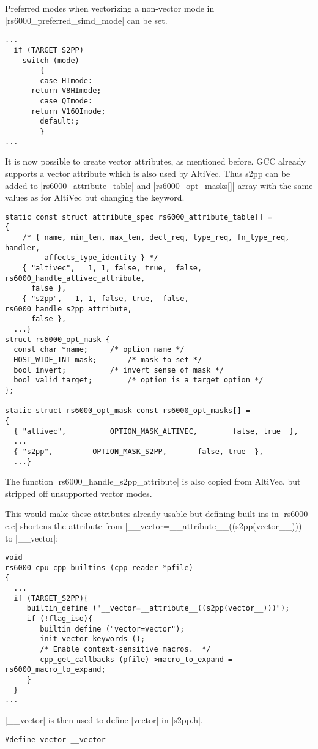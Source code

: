 Preferred modes when vectorizing a non-vector mode in |rs6000_preferred_simd_mode| can be set.
\begin{lstlisting}
...
  if (TARGET_S2PP)
    switch (mode)
        {
        case HImode:
      return V8HImode;
        case QImode:
      return V16QImode;
        default:;
        }
... 
\end{lstlisting}

It is now possible to create vector attributes, as mentioned before.
\ac{GCC} already supports a vector attribute which is also used by AltiVec.
Thus \ac{s2pp} can be added to |rs6000_attribute_table| and |rs6000_opt_masks[]| array with the same values as for AltiVec but changing the keyword.
\begin{lstlisting}
static const struct attribute_spec rs6000_attribute_table[] =
{
    /* { name, min_len, max_len, decl_req, type_req, fn_type_req, handler,
         affects_type_identity } */
    { "altivec",   1, 1, false, true,  false, rs6000_handle_altivec_attribute,
      false },
    { "s2pp",   1, 1, false, true,  false, rs6000_handle_s2pp_attribute,
      false },
  ...}
struct rs6000_opt_mask {
  const char *name;     /* option name */
  HOST_WIDE_INT mask;       /* mask to set */
  bool invert;          /* invert sense of mask */
  bool valid_target;        /* option is a target option */
};

static struct rs6000_opt_mask const rs6000_opt_masks[] =
{
  { "altivec",          OPTION_MASK_ALTIVEC,        false, true  },
  ...
  { "s2pp",         OPTION_MASK_S2PP,       false, true  },
  ...}
\end{lstlisting}

The function |rs6000_handle_s2pp_attribute| is also copied from AltiVec, but stripped off unsupported vector modes.

This would make these attributes already usable but defining built-ins in |rs6000-c.c| shortens the attribute from |__vector=__attribute__((s2pp(vector__)))| to |__vector|:
\begin{lstlisting}
void
rs6000_cpu_cpp_builtins (cpp_reader *pfile)
{
  ...
  if (TARGET_S2PP){
     builtin_define ("__vector=__attribute__((s2pp(vector__)))");
     if (!flag_iso){
        builtin_define ("vector=vector");
        init_vector_keywords ();
        /* Enable context-sensitive macros.  */
        cpp_get_callbacks (pfile)->macro_to_expand = rs6000_macro_to_expand;
     }
  }
... 
\end{lstlisting}
|__vector| is then used to define |vector| in |s2pp.h|.
\begin{lstlisting}
#define vector __vector
\end{lstlisting}


